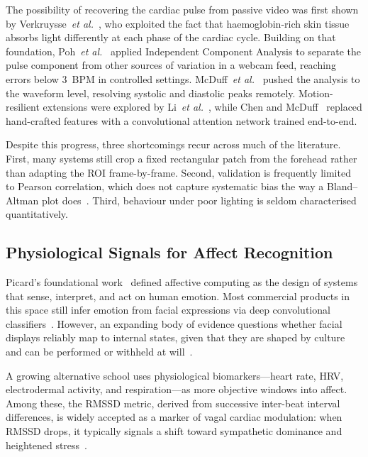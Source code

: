 \documentclass[conference]{IEEEtran}
\begin{document}
The possibility of recovering the cardiac pulse from passive video
was first shown by Verkruysse~\emph{et al.}~\cite{verkruysse2008remote},
who exploited the fact that haemoglobin-rich skin tissue absorbs
light differently at each phase of the cardiac cycle. Building on
that foundation, Poh~\emph{et al.}~\cite{poh2011advancements}
applied Independent Component Analysis to separate the pulse
component from other sources of variation in a webcam feed, reaching
errors below 3~BPM in controlled settings.
McDuff~\emph{et al.}~\cite{mcduff2017survey} pushed the analysis to
the waveform level, resolving systolic and diastolic peaks remotely.
Motion-resilient extensions were explored by
Li~\emph{et al.}~\cite{li2014remote}, while Chen and
McDuff~\cite{chen2018deepphys} replaced hand-crafted features with
a convolutional attention network trained end-to-end.

Despite this progress, three shortcomings recur across much of the
literature. First, many systems still crop a fixed rectangular
patch from the forehead rather than adapting the ROI frame-by-frame.
Second, validation is frequently limited to Pearson correlation,
which does not capture systematic bias the way a Bland--Altman
plot does~\cite{bland1986statistical}. Third, behaviour under poor
lighting is seldom characterised quantitatively.

\subsection{Physiological Signals for Affect Recognition}

Picard's foundational work~\cite{picard2001affective} defined
affective computing as the design of systems that sense, interpret,
and act on human emotion. Most commercial products in this space
still infer emotion from facial expressions via deep convolutional
classifiers~\cite{mollahosseini2017affectnet}. However, an expanding
body of evidence questions whether facial displays reliably map to
internal states, given that they are shaped by culture and can be
performed or withheld at will~\cite{barrett2019emotional}.

A growing alternative school uses physiological biomarkers---heart
rate, HRV, electrodermal activity, and respiration---as more
objective windows into affect. Among these, the RMSSD metric,
derived from successive inter-beat interval differences, is
widely accepted as a marker of vagal cardiac modulation: when
RMSSD drops, it typically signals a shift toward sympathetic
dominance and heightened stress~\cite{shaffer2017overview,
thayer2012meta}.
\end{document}
